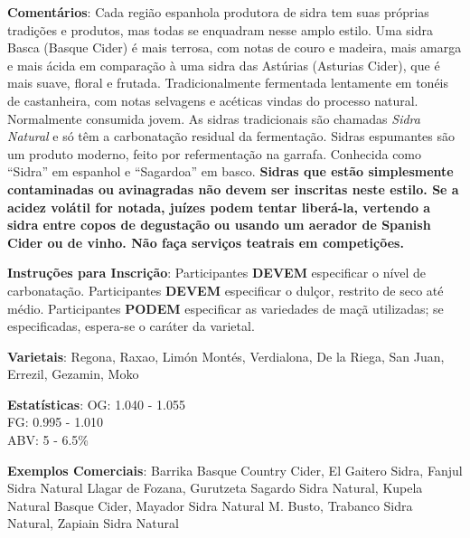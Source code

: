 \textbf{Comentários}: Cada região espanhola produtora de sidra tem suas próprias tradições e produtos, mas todas se enquadram nesse amplo estilo. Uma sidra Basca (Basque Cider) é mais terrosa, com notas de couro e madeira, mais amarga e mais ácida em comparação à uma sidra das Astúrias (Asturias Cider), que é mais suave, floral e frutada. Tradicionalmente fermentada lentamente em tonéis de castanheira, com notas selvagens e acéticas vindas do processo natural. Normalmente consumida jovem. As sidras tradicionais são chamadas \textit{Sidra Natural} e só têm a carbonatação residual da fermentação. Sidras espumantes são um produto moderno, feito por refermentação na garrafa. Conhecida como “Sidra” em espanhol e “Sagardoa” em basco. \textbf{Sidras que estão simplesmente contaminadas ou avinagradas não devem ser inscritas neste estilo. Se a acidez volátil for notada, juízes podem tentar liberá-la, vertendo a sidra entre copos de degustação ou usando um aerador de Spanish Cider ou de vinho. Não faça serviços teatrais em competições.}

\textbf{Instruções para Inscrição}: Participantes \textbf{DEVEM} especificar o nível de carbonatação. Participantes \textbf{DEVEM} especificar o dulçor, restrito de seco até médio. Participantes \textbf{PODEM} especificar as variedades de maçã utilizadas; se especificadas, espera-se o caráter da varietal.

\textbf{Varietais}: Regona, Raxao, Limón Montés, Verdialona, De la Riega, San Juan, Errezil, Gezamin, Moko

\textbf{Estatísticas}: OG: 1.040 - 1.055 \\
\phantom{ } \hspace{16.5mm} FG: 0.995 - 1.010 \\
\phantom{ } \hspace{16.5mm} ABV: 5 - 6.5\%

\textbf{Exemplos Comerciais}: Barrika Basque Country Cider, El Gaitero Sidra, Fanjul Sidra Natural Llagar de Fozana, Gurutzeta Sagardo Sidra Natural, Kupela Natural Basque Cider, Mayador Sidra Natural M. Busto, Trabanco Sidra Natural, Zapiain Sidra Natural
